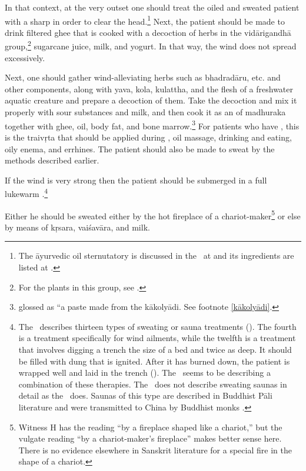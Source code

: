 \begin{translation}
In that context, at the very outset one should treat the oiled and
sweated patient with a sharp  in order to
clear the head.\footnote{The āyurvedic oil sternutatory is discussed in
    the \SS\  at  and its ingredients are listed at
    .} %
    Next, the patient should be made to drink filtered ghee that is cooked
    with a decoction of herbs in the \gls{vidārigandhā} group,\footnote{For
        the plants in this group, see \cite[55]{suve-2000}.} sugarcane juice,
        milk, and yogurt. In that way, the wind does not spread excessively.        

Next, one should gather wind-alleviating herbs such as
\gls{bhadradāru}, etc. and other components, along with \gls{yava},
\gls{kola}, \gls{kulattha}, and the flesh of a freshwater aquatic
creature and prepare a decoction of them. %
Take the decoction and mix it properly with sour substances and milk,
and then cook it as an  of \gls{madhuraka}
together with ghee, oil, body fat, and bone
marrow.\footnote{ glossed  as “a
    paste made from the \gls{kākolyādi}. See footnote \ref{kākolyādi}.}
    For patients who have , this is the
    \gls{traivṛta} that should be applied during ,
    oil massage,  drinking and eating, oily enema,
    and errhines. The patient should also be made to sweat by the methods
    described earlier.
    
If the wind is very strong then the patient should be submerged
in a full lukewarm .\footnote{The \CS\
    describes thirteen types of sweating or sauna treatments
    ().  The fourth is a
     treatment specifically for wind ailments,
    while the twelfth is a \se{kūpa}{pit} treatment that involves
    digging a trench the size of a bed and twice as deep.  It should
    be filled with dung that is ignited.  After it has burned down,
    the patient is wrapped well and laid in the trench
    ().  The \SS\ seems to be describing a
    combination of these therapies.  The \SS\ does not describe
    sweating saunas in detail as the \CS\ does.  Saunas of this type
    are described in Buddhist Pāli literature and were transmitted
    to China by Buddhist monks \citep[160--167]{kies-2013}.} %
    
Either he should be sweated either by the hot fireplace of a
chariot-maker\footnote{Witness H has the reading
     “by a fireplace shaped like a chariot,” but
    the vulgate reading \dev{rathakāracullyām} “by a chariot-maker's
    fireplace” makes better sense here. There is no evidence elsewhere
    in Sanskrit literature for a special fire in the shape of a
    chariot.} %
    or else by means of  \gls{kṛsara}, \gls{vaiśavāra}, and milk.


\end{translation}

